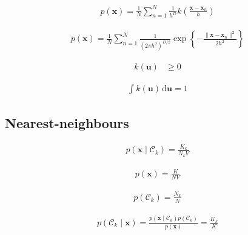 \documentclass{article}
\begin{document}
\begin{align*}
p(\mathbf{x}) = \frac{1}{N} \sum_{n=1}^{N} \frac{1}{h^{D}} k\left( \frac{\mathbf{x} - \mathbf{x}_n}{h} \right) 
\tag{3.183}
\end{align*}

\begin{align*}
p(\mathbf{x}) = \frac{1}{N} \sum_{n=1}^{N} \frac{1}{(2\pi h^2)^{D/2}} \exp \left\{ -\frac{\|\mathbf{x} - \mathbf{x}_n\|^2}{2 h^2} \right\} 
\tag{3.184}
\end{align*}

\begin{align*}
k(\mathbf{u}) & \geqslant 0
\tag{3.185}
\end{align*}

\begin{align*}
\int k(\mathbf{u}) \, \mathrm{d} \mathbf{u} = 1
\tag{3.186}
\end{align*}

\subsection{Nearest-neighbours}

\begin{align*}
p\left(\mathbf{x} \mid \mathcal{C}_k\right) = \frac{K_{k}}{N_{k} V} 
\tag{3.187}
\end{align*}

\begin{align*}
p(\mathbf{x}) = \frac{K}{N V} 
\tag{3.188}
\end{align*}

\begin{align*}
p\left(\mathcal{C}_k\right) = \frac{N_k}{N} 
\tag{3.189}
\end{align*}

\begin{align*}
p\left(\mathcal{C}_k \mid \mathbf{x}\right) = \frac{p\left(\mathbf{x} \mid \mathcal{C}_k\right) p\left(\mathcal{C}_k\right)}{p(\mathbf{x})} = \frac{K_{k}}{K} 
\tag{3.190}
\end{align*}
\end{document}
